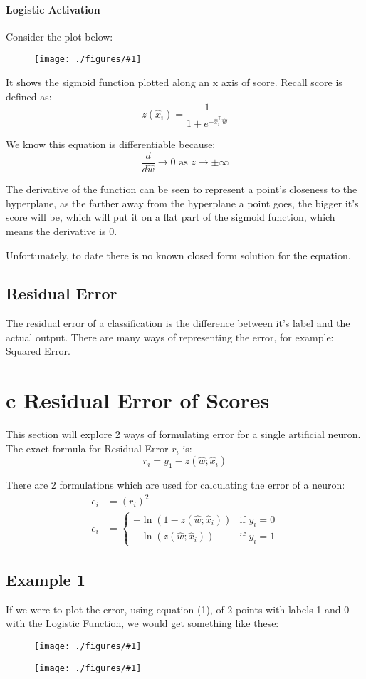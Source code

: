 \documentclass[12pt]{book}
\newcommand{\incimg}[2]{%
       \begin{figure}[h]
               \centering
               \texttt{[image: ./figures/\#1]}
       \end{figure}
}
\begin{document}
\paragraph{Logistic Activation}
Consider the plot below:
\incimg{sigmoid}{1}

It shows the sigmoid function plotted along an x axis of score.
Recall score is defined as:
\[z(\hat x_i) = \frac{1}{1+e^{-\hat x_i^\top \hat w}}\]

We know this equation is differentiable because:
\[\frac{d}{d\hat w}\rightarrow 0\text{ as } z\rightarrow\pm\infty\]

The derivative of the function can be seen to represent a point's
closeness to the hyperplane, as the farther away from the hyperplane
a point goes, the bigger it's score will be, which will put it on a 
flat part of the sigmoid function, which means the derivative is 0.

Unfortunately, to date there is no known closed form solution for the
equation.

\subsection*{Residual Error}
The residual error of a classification is the difference between 
it's label and the actual output. There are many ways of representing
the error, for example: Squared Error.

\section*{c Residual Error of Scores}
This section will explore 2 ways of formulating error for a 
single artificial neuron. The exact formula for Residual Error
$r_i$ is:
\[r_i = y_1 - z(\hat w;\hat x_i)\]

There are 2 formulations which are used for calculating the error
of a neuron:
\begin{align}
        e_i &= (r_i)^2\\
        e_i &= \begin{cases} 
                -\ln(1-z(\hat w; \hat x_i)) & \text{if } y_i = 0\\
                -\ln(z(\hat w; \hat x_i)) & \text{if } y_i = 1
        \end{cases}
\end{align}

\subsection*{Example 1}
If we were to plot the error, using equation (1),
of 2 points with labels 1 and 0 with the
Logistic Function, we would get something like these:
\incimg{sig0}{0.4}
\incimg{sig1}{0.4}
\end{document}
